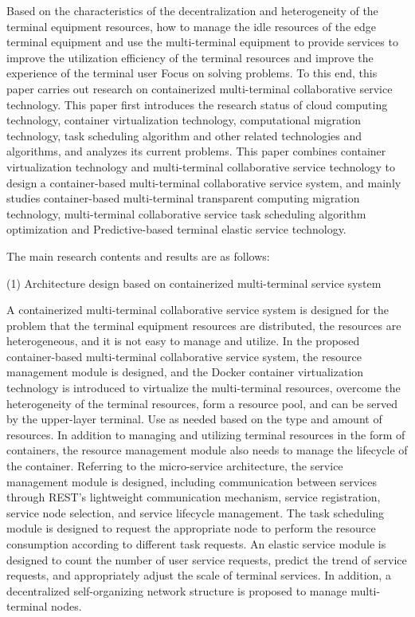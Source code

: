 Based on the characteristics of the decentralization and heterogeneity of the terminal equipment resources, how to manage the idle resources of the edge terminal equipment and use the multi-terminal equipment to provide services to improve the utilization efficiency of the terminal resources and improve the experience of the terminal user Focus on solving problems. To this end, this paper carries out research on containerized multi-terminal collaborative service technology. This paper first introduces the research status of cloud computing technology, container virtualization technology, computational migration technology, task scheduling algorithm and other related technologies and algorithms, and analyzes its current problems. This paper combines container virtualization technology and multi-terminal collaborative service technology to design a container-based multi-terminal collaborative service system, and mainly studies container-based multi-terminal transparent computing migration technology, multi-terminal collaborative service task scheduling algorithm optimization and Predictive-based terminal elastic service technology.

The main research contents and results are as follows:

(1) Architecture design based on containerized multi-terminal service system

A containerized multi-terminal collaborative service system is designed for the problem that the terminal equipment resources are distributed, the resources are heterogeneous, and it is not easy to manage and utilize. In the proposed container-based multi-terminal collaborative service system, the resource management module is designed, and the Docker container virtualization technology is introduced to virtualize the multi-terminal resources, overcome the heterogeneity of the terminal resources, form a resource pool, and can be served by the upper-layer terminal. Use as needed based on the type and amount of resources. In addition to managing and utilizing terminal resources in the form of containers, the resource management module also needs to manage the lifecycle of the container. Referring to the micro-service architecture, the service management module is designed, including communication between services through REST's lightweight communication mechanism, service registration, service node selection, and service lifecycle management. The task scheduling module is designed to request the appropriate node to perform the resource consumption according to different task requests. An elastic service module is designed to count the number of user service requests, predict the trend of service requests, and appropriately adjust the scale of terminal services. In addition, a decentralized self-organizing network structure is proposed to manage multi-terminal nodes.

